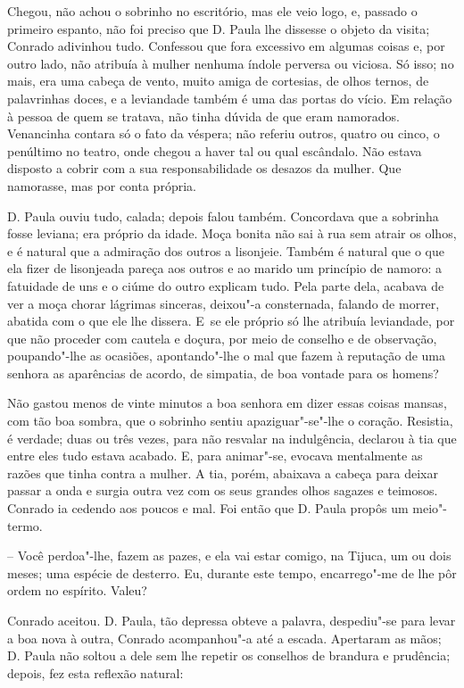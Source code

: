 Chegou, não achou o sobrinho no escritório, mas ele veio logo, e,
passado o primeiro espanto, não foi preciso que D. Paula lhe dissesse o
objeto da visita; Conrado adivinhou tudo. Confessou que fora excessivo
em algumas coisas e, por outro lado, não atribuía à mulher nenhuma
índole perversa ou viciosa. Só isso; no mais, era uma cabeça de vento,
muito amiga de cortesias, de olhos ternos, de palavrinhas doces, e a
leviandade também é uma das portas do vício. Em relação à pessoa de quem
se tratava, não tinha dúvida de que eram namorados. Venancinha contara
só o fato da véspera; não referiu outros, quatro ou cinco, o penúltimo
no teatro, onde chegou a haver tal ou qual escândalo. Não estava
disposto a cobrir com a sua responsabilidade os desazos da mulher. Que
namorasse, mas por conta própria.

D. Paula ouviu tudo, calada; depois falou também. Concordava que a
sobrinha fosse leviana; era próprio da idade. Moça bonita não sai à rua
sem atrair os olhos, e é natural que a admiração dos outros a lisonjeie.
Também é natural que o que ela fizer de lisonjeada pareça aos outros e
ao marido um princípio de namoro: a fatuidade de uns e o ciúme do outro
explicam tudo. Pela parte dela, acabava de ver a moça chorar lágrimas
sinceras, deixou"-a consternada, falando de morrer, abatida com o que ele
lhe dissera. E~se ele próprio só lhe atribuía leviandade, por que não
proceder com cautela e doçura, por meio de conselho e de observação,
poupando"-lhe as ocasiões, apontando"-lhe o mal que fazem à reputação de
uma senhora as aparências de acordo, de simpatia, de boa vontade para os
homens?

Não gastou menos de vinte minutos a boa senhora em dizer essas coisas
mansas, com tão boa sombra, que o sobrinho sentiu apaziguar"-se"-lhe o
coração. Resistia, é verdade; duas ou três vezes, para não resvalar na
indulgência, declarou à tia que entre eles tudo estava acabado. E, para
animar"-se, evocava mentalmente as razões que tinha contra a mulher. A
tia, porém, abaixava a cabeça para deixar passar a onda e surgia outra
vez com os seus grandes olhos sagazes e teimosos. Conrado ia cedendo aos
poucos e mal. Foi então que D. Paula propôs um meio"-termo.

-- Você perdoa"-lhe, fazem as pazes, e ela vai estar comigo, na Tijuca,
um ou dois meses; uma espécie de desterro. Eu, durante este tempo,
encarrego"-me de lhe pôr ordem no espírito. Valeu?

Conrado aceitou. D. Paula, tão depressa obteve a palavra, despediu"-se
para levar a boa nova à outra, Conrado acompanhou"-a até a escada.
Apertaram as mãos; D. Paula não soltou a dele sem lhe repetir os
conselhos de brandura e prudência; depois, fez esta reflexão natural:

